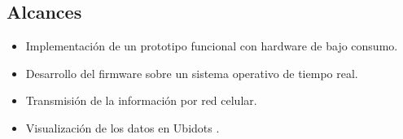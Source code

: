 \subsection{Alcances}

\begin{itemize}
  \item Implementación de un prototipo funcional con hardware de bajo consumo. 	
  \item Desarrollo del firmware sobre un sistema operativo de tiempo real.
  \item Transmisión de la información por red celular.
  \item Visualización de los datos en Ubidots \citep{InterfazIoTUbidots}.
\end{itemize}